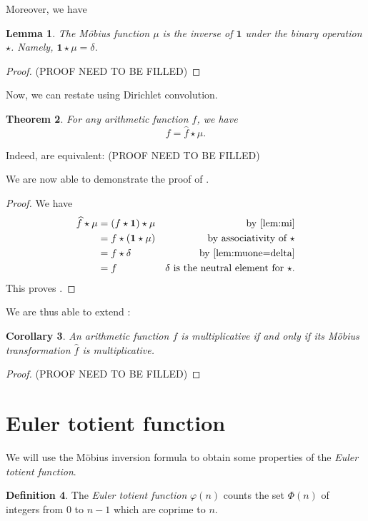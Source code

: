 \documentclass[11pt]{article}
\theoremstyle{plain}
\newtheorem{theorem}{Theorem}[section]
\newtheorem{lemma}[theorem]{Lemma}
\newtheorem{corollary}[theorem]{Corollary}
\theoremstyle{definition}
\newtheorem{definition}[theorem]{Definition}
\theoremstyle{remark}
\numberwithin{equation}{section}
\begin{document}
Moreover, we have 
\begin{lemma}\label{lem:muone=delta}
	The Möbius function $\mu$ is the inverse of $\bm{1}$ under the binary operation $\star$. 
	Namely, $\bm{1}\star\mu = \delta$.
\end{lemma}
\begin{proof}
	{\color{red} (PROOF NEED TO BE FILLED)}
\end{proof}

Now, we can restate  using Dirichlet convolution.
\begin{theorem}\label{thm:mif-2}
	For any arithmetic function $f$, we have 
	\begin{equation}\label{eq:thm9}
		f = \widehat{f}\star\mu.
	\end{equation}
\end{theorem}
Indeed,  are equivalent: {\color{red} (PROOF NEED TO BE FILLED)}

We are now able to demonstrate the proof of .
\begin{proof}
	We have 
	\begin{align*}
		\widehat{f}\star\mu 
		&= (f\star\bm{1})\star\mu &\text{by \Cref{lem:mi}}\\
		&= f\star(\bm{1}\star\mu) &\text{by associativity of $\star$}\\
		&= f\star\delta &\text{by \Cref{lem:muone=delta}}\\
		&= f &\text{$\delta$ is the neutral element for $\star$}.
	\end{align*}
	This proves .
\end{proof}

We are thus able to extend :
\begin{corollary}\label{cor:mitism}
	An arithmetic function $f$ is multiplicative if and only if its M\"obius transformation $\widehat{f}$ is multiplicative.
\end{corollary}
\begin{proof}
	{\color{red} (PROOF NEED TO BE FILLED)}
\end{proof}


\section{Euler totient function}\label{sec:4}
We will use the Möbius inversion formula to obtain some properties of the \emph{Euler totient function}.
\begin{definition}
	The \emph{Euler totient function} $\varphi(n)$ counts the set $\Phi(n)$ of integers from $0$ to $n-1$ which are coprime to $n$.
\end{definition}
\end{document}
